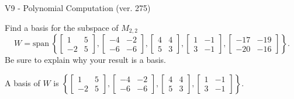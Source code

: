 \begin{exercise}
  \begin{exerciseTitle}V9 - Polynomial Computation (ver. 275)\end{exerciseTitle}
  \begin{exerciseStatement}
    Find a basis for the subspace of \(M_{2,2}\) 
\[W=\mathrm{span}\ \left\{\left[\begin{array}{cc}
1 & 5 \\
-2 & 5
\end{array}\right] , \left[\begin{array}{cc}
-4 & -2 \\
-6 & -6
\end{array}\right] , \left[\begin{array}{cc}
4 & 4 \\
5 & 3
\end{array}\right] , \left[\begin{array}{cc}
1 & -1 \\
3 & -1
\end{array}\right] , \left[\begin{array}{cc}
-17 & -19 \\
-20 & -16
\end{array}\right]\right\}.\]
 Be sure to explain why your result is a basis.


  \end{exerciseStatement}
  \begin{exerciseAnswer}
   A basis of \(W\) is  \(\left\{\left[\begin{array}{cc}
1 & 5 \\
-2 & 5
\end{array}\right] , \left[\begin{array}{cc}
-4 & -2 \\
-6 & -6
\end{array}\right] , \left[\begin{array}{cc}
4 & 4 \\
5 & 3
\end{array}\right] , \left[\begin{array}{cc}
1 & -1 \\
3 & -1
\end{array}\right]\right\}\).
  


  \end{exerciseAnswer}
\end{exercise}